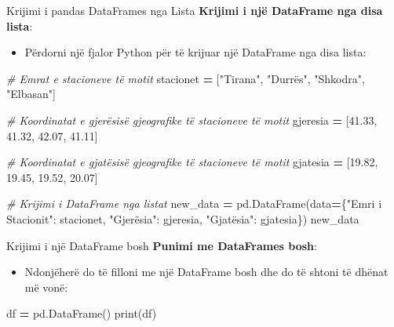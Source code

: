 \documentclass[
  ignorenonframetext,
]{beamer}
\newenvironment{Shaded}{\begin{snugshade}}{\end{snugshade}}
\newcommand{\BuiltInTok}[1]{#1}
\newcommand{\CommentTok}[1]{\textcolor[rgb]{0.56,0.35,0.01}{\textit{#1}}}
\newcommand{\FloatTok}[1]{\textcolor[rgb]{0.00,0.00,0.81}{#1}}
\newcommand{\NormalTok}[1]{#1}
\newcommand{\OperatorTok}[1]{\textcolor[rgb]{0.81,0.36,0.00}{\textbf{#1}}}
\newcommand{\StringTok}[1]{\textcolor[rgb]{0.31,0.60,0.02}{#1}}
\providecommand{\tightlist}{%
  \setlength{\itemsep}{0pt}\setlength{\parskip}{0pt}}
\begin{document}
\begin{frame}[fragile]{Krijimi i pandas DataFrames nga Lista}
\protect\hypertarget{krijimi-i-pandas-dataframes-nga-lista}{}
\textbf{Krijimi i një DataFrame nga disa lista}:

\begin{itemize}
\tightlist
\item
  Përdorni një fjalor Python për të krijuar një DataFrame nga disa
  lista:
\end{itemize}

\begin{Shaded}
\begin{Highlighting}[]
 \CommentTok{\# Emrat e stacioneve të motit}
\NormalTok{    stacionet }\OperatorTok{=}\NormalTok{ [}\StringTok{"Tirana"}\NormalTok{, }\StringTok{"Durrës"}\NormalTok{, }\StringTok{"Shkodra"}\NormalTok{, }\StringTok{"Elbasan"}\NormalTok{]}

    \CommentTok{\# Koordinatat e gjerësisë gjeografike të stacioneve të motit}
\NormalTok{    gjeresia }\OperatorTok{=}\NormalTok{ [}\FloatTok{41.33}\NormalTok{, }\FloatTok{41.32}\NormalTok{, }\FloatTok{42.07}\NormalTok{, }\FloatTok{41.11}\NormalTok{]}

    \CommentTok{\# Koordinatat e gjatësisë gjeografike të stacioneve të motit}
\NormalTok{    gjatesia }\OperatorTok{=}\NormalTok{ [}\FloatTok{19.82}\NormalTok{, }\FloatTok{19.45}\NormalTok{, }\FloatTok{19.52}\NormalTok{, }\FloatTok{20.07}\NormalTok{]}

    \CommentTok{\# Krijimi i DataFrame nga listat}
\NormalTok{    new\_data }\OperatorTok{=}\NormalTok{ pd.DataFrame(data}\OperatorTok{=}\NormalTok{\{}\StringTok{"Emri i Stacionit"}\NormalTok{: stacionet, }\StringTok{"Gjerësia"}\NormalTok{: gjeresia, }\StringTok{"Gjatësia"}\NormalTok{: gjatesia\})}
\NormalTok{    new\_data}
\end{Highlighting}
\end{Shaded}
\end{frame}

\begin{frame}[fragile]{Krijimi i një DataFrame bosh}
\protect\hypertarget{krijimi-i-njuxeb-dataframe-bosh}{}
\textbf{Punimi me DataFrames bosh}:

\begin{itemize}
\tightlist
\item
  Ndonjëherë do të filloni me një DataFrame bosh dhe do të shtoni të
  dhënat më vonë:
\end{itemize}

\begin{Shaded}
\begin{Highlighting}[]
\NormalTok{    df }\OperatorTok{=}\NormalTok{ pd.DataFrame()}
    \BuiltInTok{print}\NormalTok{(df)}
\end{Highlighting}
\end{Shaded}
\end{frame}
\end{document}
